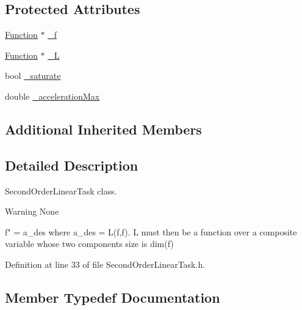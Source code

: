 \subsection*{Protected Attributes}
\begin{DoxyCompactItemize}
\item 
\hyperlink{classocra_1_1Function}{Function} $\ast$ \hyperlink{classocra_1_1SecondOrderLinearTask_a55c45007880f6ba1936bc9b4601dc58e}{\+\_\+f}
\item 
\hyperlink{classocra_1_1Function}{Function} $\ast$ \hyperlink{classocra_1_1SecondOrderLinearTask_a386a6daf02add8b19a69e1aa411c63af}{\+\_\+L}
\item 
bool \hyperlink{classocra_1_1SecondOrderLinearTask_a0d433a32e0892bdf98d3b15325b6917e}{\+\_\+saturate}
\item 
double \hyperlink{classocra_1_1SecondOrderLinearTask_aec8499eb3b78b46a1170d43f427a53a9}{\+\_\+acceleration\+Max}
\end{DoxyCompactItemize}
\subsection*{Additional Inherited Members}


\subsection{Detailed Description}
Second\+Order\+Linear\+Task class. 

\begin{DoxyWarning}{Warning}
None
\end{DoxyWarning}
f" = a\+\_\+des where a\+\_\+des = L(f,f\textquotesingle{}). L must then be a function over a composite variable whose two components\textquotesingle{} size is dim(f) 

Definition at line 33 of file Second\+Order\+Linear\+Task.\+h.



\subsection{Member Typedef Documentation}
\hypertarget{classocra_1_1SecondOrderLinearTask_aa4843b0b2ad21ecba7decb2be86c6214}{}\label{classocra_1_1SecondOrderLinearTask_aa4843b0b2ad21ecba7decb2be86c6214} 
